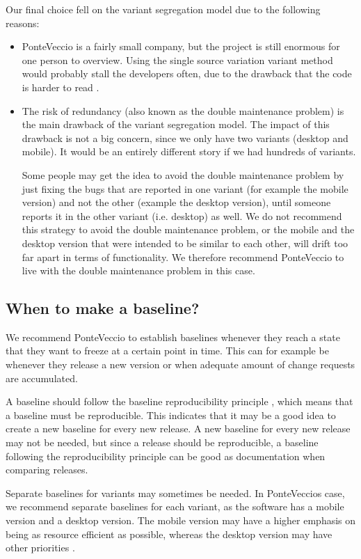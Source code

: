 \documentclass[10pt]{article}
\begin{document}
\noindent Our final choice fell on the variant segregation model due to the following reasons:
\begin{itemize}
\item PonteVeccio is a fairly small company, but the project is still enormous for one person to overview. Using the single source variation variant method would probably stall the developers often, due to the drawback that the code is harder to read \cite{Mahler}.
\item The risk of redundancy (also known as the double maintenance problem\cite{Babich}) is the main drawback of the variant segregation model\cite{Mahler}. The impact of this drawback is not a big concern, since we only have two variants (desktop and mobile). It would be an entirely different story if we had hundreds of variants. 

\noindent Some people may get the idea to avoid the double maintenance problem by just fixing the bugs that are reported in one variant (for example the mobile version) and not the other (example the desktop version), until someone reports it in the other variant (i.e. desktop) as well. We do not recommend this strategy to avoid the double maintenance problem, or the mobile and the desktop version that were intended to be similar to each other, will drift too far apart in terms of functionality. We therefore recommend PonteVeccio to live with the double maintenance problem in this case.

\end{itemize}
\noindent
\subsection{When to make a baseline?}
We recommend PonteVeccio to establish baselines whenever they reach a state that they want to freeze at a certain point in time. This can for example be whenever they release a new version or when adequate amount of change requests are accumulated. 

\noindent A baseline should follow the baseline reproducibility principle \cite{Appleton2}, which means that a baseline must be reproducible. This indicates that it may be a good idea to create a new baseline for every new release. A new baseline for every new release may not be needed, but since a release should be reproducible, a baseline following the reproducibility principle can be good as documentation when comparing releases.

\noindent Separate baselines for variants may sometimes be needed. In PonteVeccios case, we recommend separate baselines for each variant, as the software has a mobile version and a desktop version. The mobile version may have a higher emphasis on being as resource efficient as possible, whereas the desktop version may have other priorities \cite{Nielsen}.
\end{document}
